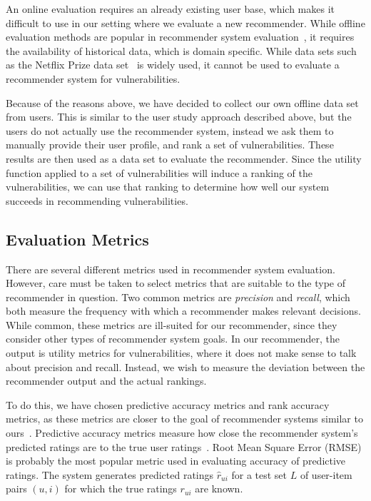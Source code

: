 {An online evaluation requires an already existing user base, which makes it difficult to use in our setting where we evaluate a new recommender.
While offline evaluation methods are popular in recommender system evaluation~\cite{aggarwal:2016}, it requires the availability of historical data, which is domain specific.
While data sets such as the Netflix Prize data set~\cite{netflixprize} is widely used, it cannot be used to evaluate a recommender system for vulnerabilities.

Because of the reasons above, we have decided to collect our own offline data set from users.
This is similar to the user study approach described above, but the users do not actually use the recommender system, instead we ask them to manually provide their user profile, and rank a set of vulnerabilities.
These results are then used as a data set to evaluate the recommender. Since the utility function applied to a set of vulnerabilities will induce a ranking of the vulnerabilities, we can use that ranking to determine how well our system succeeds in recommending vulnerabilities.

\subsection{Evaluation Metrics}
There are several different metrics used in recommender system evaluation.
However, care must be taken to select metrics that are suitable to the type of recommender in question.
Two common metrics are \emph{precision} and \emph{recall}, which both measure the frequency with which a recommender makes relevant decisions.
While common, these metrics are ill-suited for our recommender, since they consider other types of recommender system goals.
In our recommender, the output is utility metrics for vulnerabilities, where it does not make sense to talk about precision and recall.
Instead, we wish to measure the deviation between the recommender output and the actual rankings.

To do this, we have chosen predictive accuracy metrics and rank accuracy metrics, as these metrics are closer to the goal of recommender systems similar to ours~\cite{degemmis:2007,rosaci:2009}.
Predictive accuracy metrics measure how close the recommender system's predicted ratings are to the true user ratings~\cite{gunawardana:2015}.
Root Mean Square Error (RMSE) is probably the most popular metric used in evaluating accuracy of predictive ratings.
The system generates predicted ratings $\hat{r}_{ui}$ for a test set $L$ of user-item pairs $(u,i)$ for which the true ratings ${r}_{ui}$ are known.

}
